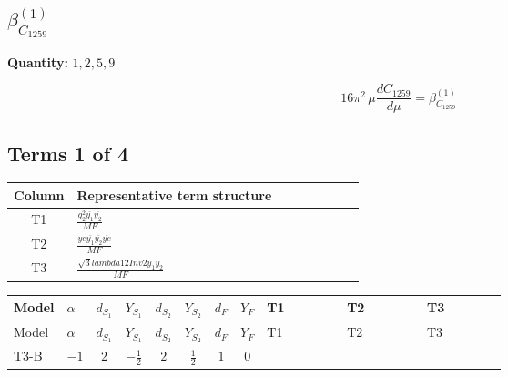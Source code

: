\documentclass[8pt]{article}
\begin{document}
\begin{landscape}
\section*{$\beta_{C_{1259}}^{(1)}$}
\noindent\textbf{Quantity: }$\mathrm{1,2,5,9}$\par\smallskip
\[16\pi^2\,\mu\frac{d C_{1259}}{d\mu}=\beta_{C_{1259}}^{(1)}\]
\subsection*{Terms 1 of 4}
\begin{center}
\begin{tabular}{@{}c >{\raggedright\arraybackslash}p{0.82\linewidth}@{}}
\toprule
Column & Representative term structure \\
\midrule
T1 & \(\displaystyle \frac{g_{2}^{2} \overline{y_{1}} \overline{y_{2}}}{MF}\) \\
\midrule
T2 & \(\displaystyle \frac{ye \overline{y_{1}} \overline{y_{2}} \overline{ye}}{MF}\) \\
\midrule
T3 & \(\displaystyle \frac{\sqrt{3} lambda12Inv2 \overline{y_{1}} \overline{y_{2}}}{MF}\) \\
\midrule
\bottomrule
\end{tabular}
\end{center}
\smallskip
\tiny
\begin{longtable}{@{}llcccccc >{\raggedright\arraybackslash}p{0.21\linewidth} >{\raggedright\arraybackslash}p{0.21\linewidth} >{\raggedright\arraybackslash}p{0.21\linewidth}@{}}
\toprule
Model & $\alpha$ & $d_{S_1}$ & $Y_{S_1}$ & $d_{S_2}$ & $Y_{S_2}$ & $d_F$ & $Y_F$ & T1 & T2 & T3 \\
\midrule
\endfirsthead
\toprule
Model & $\alpha$ & $d_{S_1}$ & $Y_{S_1}$ & $d_{S_2}$ & $Y_{S_2}$ & $d_F$ & $Y_F$ & T1 & T2 & T3 \\
\midrule
\endhead
T3-B & $-1$ & $2$ & $-\frac{1}{2}$ & $2$ & $\frac{1}{2}$ & $1$ & $0$ & \scriptsize\adjustbox{max width=\linewidth}{$\begin{gathered} \frac{3 g_{2}^{2} \overline{y_{1}} \overline{y_{2}}}{8 MF}\end{gathered}$} & \scriptsize\adjustbox{max width=\linewidth}{$\begin{gathered} - \frac{ye \overline{y_{1}} \overline{y_{2}} \overline{ye}}{8 MF}\end{gathered}$} & \scriptsize\adjustbox{max width=\linewidth}{$\begin{gathered} \frac{\sqrt{3} lambda12Inv2 \overline{y_{1}} \overline{y_{2}}}{6 MF}\end{gathered}$} \\

\end{longtable}
\end{landscape}
\end{document}
